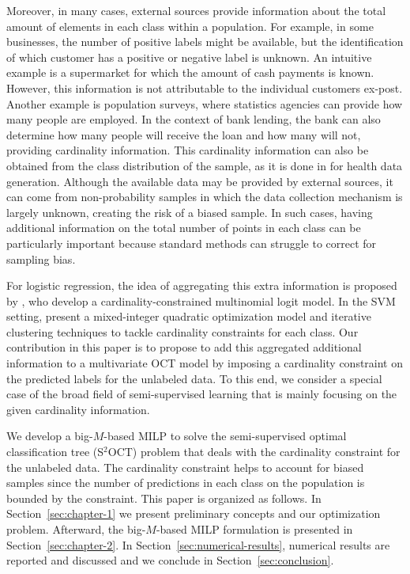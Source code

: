 \documentclass[a4paper,american,reqno]{amsart}
\newcommand{\rev}[1]{#1}
\begin{document}
Moreover, in many cases, external sources provide information
about the total amount of elements in each class within a
population.
For example, in some businesses, the number of positive labels might
be available, but the identification of which customer has a positive
or negative label is unknown.
An intuitive example is a supermarket for which the amount of cash
payments is known.
However, this information is not attributable to the individual
customers ex-post.
Another example is population surveys, where statistics agencies can
provide how many people are employed.
\rev{In the context of bank lending, the bank can also determine how
  many people will receive the loan and how many will not, providing
  cardinality information. This cardinality information can also be
  obtained from the class distribution of the sample, as it is done in
  \textcite{BURGARD2026107337} for health data generation.}
\rev{Although the available data may be provided by external sources,
  it can come from non-probability samples in which the data
  collection mechanism is largely unknown, creating the risk of a
  biased sample. In such cases, having additional information on the
  total number of points in each class can be particularly important
  because standard methods can struggle to correct for sampling bias.}

For logistic regression, the idea of aggregating this extra
information is proposed by \textcite{Burgard2021CSDA}, who develop
a cardinality-constrained multinomial logit model.
In the SVM setting, \textcite{constrainedSVM} present a mixed-integer
quadratic optimization model and iterative clustering techniques to
tackle cardinality constraints for each class.
Our contribution \rev{in this paper} is to propose to add this
aggregated additional information to a multivariate OCT model by
imposing a cardinality constraint on the predicted labels for the
unlabeled data.
\rev{To this end, we consider a special case of the broad field of
  semi-supervised learning that is mainly focusing on the given
  cardinality information.}

We develop a big-$M$-based MILP to solve the semi-supervised optimal
classification tree (S$^2$OCT) problem that deals with the cardinality
constraint for the unlabeled data.
The cardinality constraint helps to account for biased samples since
the number of predictions in each class on the population is bounded
by the constraint.
This paper is organized as follows.
In Section~\ref{sec:chapter-1} we present preliminary concepts and our
optimization problem.
Afterward, the big-$M$-based MILP formulation is presented in
Section~\ref{sec:chapter-2}.
In Section~\ref{sec:numerical-results}, numerical results are reported
and discussed and we conclude in Section~\ref{sec:conclusion}.
\end{document}
